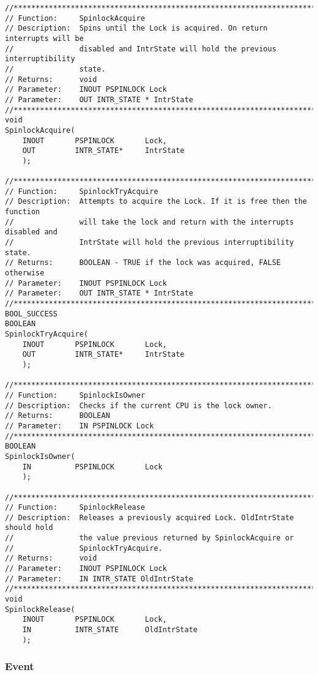 \begin{appendices}
\begin{lstlisting}[caption={Spinlock Interface},label={lst:Spinlock}]
//******************************************************************************
// Function:     SpinlockAcquire
// Description:  Spins until the Lock is acquired. On return interrupts will be
//               disabled and IntrState will hold the previous interruptibility
//               state.
// Returns:      void
// Parameter:    INOUT PSPINLOCK Lock
// Parameter:    OUT INTR_STATE * IntrState
//******************************************************************************
void
SpinlockAcquire(
    INOUT       PSPINLOCK       Lock,
    OUT         INTR_STATE*     IntrState
    );

//******************************************************************************
// Function:     SpinlockTryAcquire
// Description:  Attempts to acquire the Lock. If it is free then the function
//               will take the lock and return with the interrupts disabled and
//               IntrState will hold the previous interruptibility state.
// Returns:      BOOLEAN - TRUE if the lock was acquired, FALSE otherwise
// Parameter:    INOUT PSPINLOCK Lock
// Parameter:    OUT INTR_STATE * IntrState
//******************************************************************************
BOOL_SUCCESS
BOOLEAN
SpinlockTryAcquire(
    INOUT       PSPINLOCK       Lock,
    OUT         INTR_STATE*     IntrState
    );

//******************************************************************************
// Function:     SpinlockIsOwner
// Description:  Checks if the current CPU is the lock owner.
// Returns:      BOOLEAN
// Parameter:    IN PSPINLOCK Lock
//******************************************************************************
BOOLEAN
SpinlockIsOwner(
    IN          PSPINLOCK       Lock
    );

//******************************************************************************
// Function:     SpinlockRelease
// Description:  Releases a previously acquired Lock. OldIntrState should hold
//               the value previous returned by SpinlockAcquire or
//               SpinlockTryAcquire.
// Returns:      void
// Parameter:    INOUT PSPINLOCK Lock
// Parameter:    IN INTR_STATE OldIntrState
//******************************************************************************
void
SpinlockRelease(
    INOUT       PSPINLOCK       Lock,
    IN          INTR_STATE      OldIntrState
    );
\end{lstlisting}

\subsubsection{Event}


\end{appendices}
